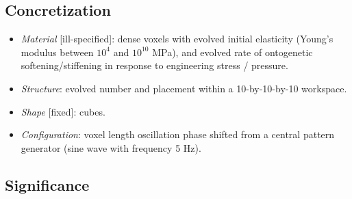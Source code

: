 \subsection{Concretization}


\begin{itemize}
    \item \textit{Material} [ill-specified]: dense voxels with evolved initial elasticity (Young's modulus between $10^4$ and $10^{10}$ MPa), and evolved rate of ontogenetic softening/stiffening in response to engineering stress / pressure.
    \item \textit{Structure}: evolved number and placement within a 10-by-10-by-10 workspace.
    \item \textit{Shape} [fixed]: cubes.
    \item \textit{Configuration}: voxel length oscillation phase shifted from a central pattern generator (sine wave with frequency 5 Hz).
\end{itemize}




\subsection{Significance}


